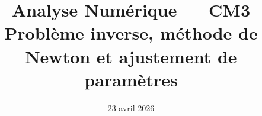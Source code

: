 


\newcommand{\atrou}[2][3cm]{%
  \ifthenelse{\boolean{showSolutions}}{%
    \par\vspace{0.5em}%
    \begin{mdframed}[backgroundcolor=ThemeLight, linewidth=0pt,
      skipabove=0pt, skipbelow=0pt,
      innertopmargin=8pt, innerbottommargin=8pt]%
    #2%
    \end{mdframed}%
    \par\vspace{0.5em}%
  }{%
    \par\vspace{0.5em}%
    \noindent\fbox{\begin{minipage}[c][#1]%
      {\dimexpr\textwidth-2\fboxsep-2\fboxrule\relax}%
      \color{white}\rule{0pt}{0pt}%
    \end{minipage}}%
    \par\vspace{0.5em}%
  }%
}

\newcommand{\val}[1]{%
  \ifthenelse{\boolean{showSolutions}}{#1}{\phantom{#1}}%
}

\newcommand{\esquisse}[1][5.5cm]{%
  \begin{center}%
  \ifthenelse{\boolean{showSolutions}}{%
    \fbox{\begin{minipage}[c][#1]{0.85\textwidth}%
      \centering\vfill
      \textit{\small Croquis réalisé en cours.}%
      \vfill
    \end{minipage}}%
  }{%
    \fbox{\begin{minipage}[c][#1]{0.85\textwidth}%
      \hfill\vfill\hfill
    \end{minipage}}%
  }%
  \end{center}%
}

\newcommand{\degC}{\text{\textdegree C}}

\title{\sffamily\bfseries Analyse Numérique --- CM3\\[0.3em]
  \Large Problème inverse, méthode de Newton et ajustement de paramètres}
\author{}
\date{23 avril 2026}


\sffamily
\maketitle
\thispagestyle{empty}

